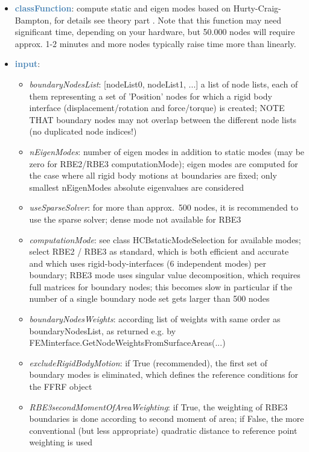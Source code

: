 \begin{itemize}[leftmargin=1.4cm]
\begin{itemize}[leftmargin=1.4cm]
\begin{itemize}[leftmargin=1.4cm]
\begin{itemize}[leftmargin=0.5cm]
\begin{itemize}[leftmargin=1.4cm]
\begin{itemize}[leftmargin=1.4cm]
\begin{itemize}[leftmargin=1.4cm]
\begin{itemize}[leftmargin=0.5cm]
\begin{itemize}[leftmargin=0.7cm]
\item[--]\textcolor{steelblue}{\bf classFunction}: compute static  and eigen modes based on Hurty-Craig-Bampton, for details see theory part . Note that this function may need significant time, depending on your hardware, but 50.000 nodes will require approx. 1-2 minutes and more nodes typically raise time more than linearly.
\item[--]\textcolor{steelblue}{\bf input}: \vspace{-6pt}
\begin{itemize}[leftmargin=1.2cm]
\setlength{\itemindent}{-0.7cm}
\item[]{\it boundaryNodesList}: [nodeList0, nodeList1, ...] a list of node lists, each of them representing a set of 'Position' nodes for which a rigid body interface (displacement/rotation and force/torque) is created; NOTE THAT boundary nodes may not overlap between the different node lists (no duplicated node indices!)
\item[]{\it nEigenModes}: number of eigen modes in addition to static modes (may be zero for RBE2/RBE3 computationMode); eigen modes are computed for the case where all rigid body motions at boundaries are fixed; only smallest nEigenModes absolute eigenvalues are considered
\item[]{\it useSparseSolver}: for more than approx.~500 nodes, it is recommended to use the sparse solver; dense mode not available for RBE3
\item[]{\it computationMode}: see class HCBstaticModeSelection for available modes; select RBE2 / RBE3 as standard, which is both efficient and accurate and which uses rigid-body-interfaces (6 independent modes) per boundary; RBE3 mode uses singular value decomposition, which requires full matrices for boundary nodes; this becomes slow in particular if the number of a single boundary node set gets larger than 500 nodes
\item[]{\it boundaryNodesWeights}: according list of weights with same order as boundaryNodesList, as returned e.g. by FEMinterface.GetNodeWeightsFromSurfaceAreas(...)
\item[]{\it excludeRigidBodyMotion}: if True (recommended), the first set of boundary modes is eliminated, which defines the reference conditions for the FFRF object
\item[]{\it RBE3secondMomentOfAreaWeighting}: if True, the weighting of RBE3 boundaries is done according to second moment of area; if False, the more conventional (but less appropriate) quadratic distance to reference point weighting is used

\end{itemize}
\end{itemize}
\end{itemize}
\end{itemize}
\end{itemize}
\end{itemize}
\end{itemize}
\end{itemize}
\end{itemize}
\end{itemize}
